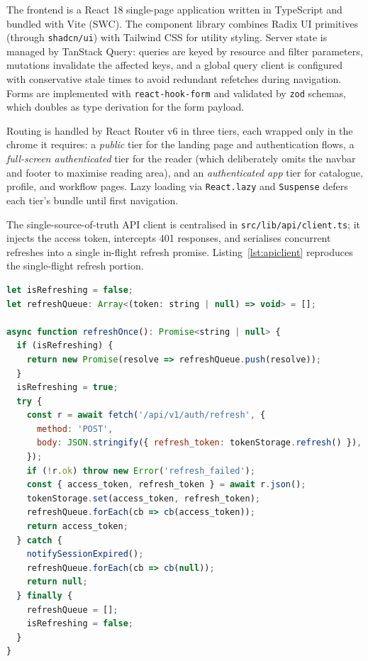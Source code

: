\documentclass[12pt,a4paper]{report}
\begin{document}
The frontend is a React 18 single-page application written in TypeScript
and bundled with Vite (SWC). The component library combines Radix UI
primitives (through \texttt{shadcn/ui}) with Tailwind CSS for utility
styling. Server state is managed by TanStack Query: queries are keyed by
resource and filter parameters, mutations invalidate the affected keys,
and a global query client is configured with conservative stale times to
avoid redundant refetches during navigation. Forms are implemented with
\texttt{react-hook-form} and validated by \texttt{zod} schemas, which
doubles as type derivation for the form payload.

Routing is handled by React Router v6 in three tiers, each wrapped only
in the chrome it requires: a \textit{public} tier for the landing page
and authentication flows, a \textit{full-screen authenticated} tier for
the reader (which deliberately omits the navbar and footer to maximise
reading area), and an \textit{authenticated app} tier for catalogue,
profile, and workflow pages. Lazy loading via \texttt{React.lazy} and
\texttt{Suspense} defers each tier's bundle until first navigation.

The single-source-of-truth API client is centralised in
\texttt{src/lib/api/client.ts}; it injects the access token, intercepts
401 responses, and serialises concurrent refreshes into a single
in-flight refresh promise. Listing~\ref{lst:apiclient} reproduces the
single-flight refresh portion.

\begin{lstlisting}[language=JavaScript,caption={Single-flight refresh in the frontend API client (excerpt).},label=lst:apiclient]
let isRefreshing = false;
let refreshQueue: Array<(token: string | null) => void> = [];

async function refreshOnce(): Promise<string | null> {
  if (isRefreshing) {
    return new Promise(resolve => refreshQueue.push(resolve));
  }
  isRefreshing = true;
  try {
    const r = await fetch('/api/v1/auth/refresh', {
      method: 'POST',
      body: JSON.stringify({ refresh_token: tokenStorage.refresh() }),
    });
    if (!r.ok) throw new Error('refresh_failed');
    const { access_token, refresh_token } = await r.json();
    tokenStorage.set(access_token, refresh_token);
    refreshQueue.forEach(cb => cb(access_token));
    return access_token;
  } catch {
    notifySessionExpired();
    refreshQueue.forEach(cb => cb(null));
    return null;
  } finally {
    refreshQueue = [];
    isRefreshing = false;
  }
}
\end{lstlisting}
\end{document}
